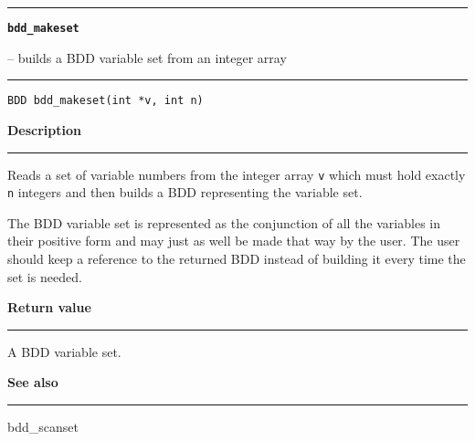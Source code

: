 \begin{minipage}{\textwidth}

\noindent\begin{minipage}{\textwidth}
\rule{\textwidth}{0.5mm}
{\tt\bf bdd\_makeset }
\--- builds a BDD variable set from an integer array  \hspace{\fill}
\\\rule[1.5ex]{\textwidth}{0.5mm}
\end{minipage}

\noindent\begin{verbatim}
BDD bdd_makeset(int *v, int n) 
\end{verbatim}

\vspace{\parsep}\noindent
{\bf Description}\\\rule[1.5ex]{\textwidth}{0.2mm}\vspace{-1.5ex}\setlength{\parindent}{1em}
Reads a set of variable numbers from the integer array {\tt v}
           which must hold exactly {\tt n} integers and then builds a BDD
	   representing the variable set.

	   The BDD variable set is represented as the conjunction of
	   all the variables in their positive form and may just as
	   well be made that way by the user. The user should keep a
	   reference to the returned BDD instead of building it every
	   time the set is needed. 

\setlength{\parindent}{0em}\vspace{\parsep}\vspace{\baselineskip}\noindent
{\bf Return value}\\\rule[1.5ex]{\textwidth}{0.2mm}\vspace{-1.5ex}
A BDD variable set. 

\vspace{\parsep}\vspace{\baselineskip}\noindent
{\bf See also}\\\rule[1.5ex]{\textwidth}{0.2mm}\vspace{-1.5ex}
bdd\_scanset 
\end{minipage}
\vspace{8ex}
